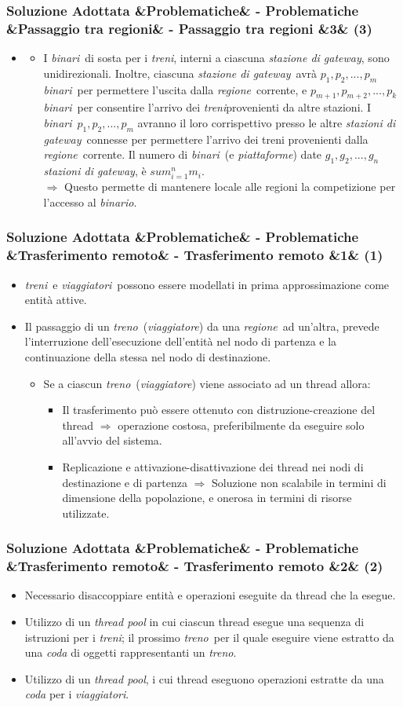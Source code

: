 \documentclass[slidestop,compress,blackandwhite]{beamer}
\newcommand{\ii}[1]{\textit{#1}}
\newcommand{\treno}{\ii{treno}}
\newcommand{\treni}{\ii{treni}}
\newcommand{\viaggiatore}{\ii{viaggiatore}}
\newcommand{\viaggiatori}{\ii{viaggiatori}}
\newcommand{\piattaforme}{\ii{piattaforme}}
\newcommand{\binario}{\ii{binario}}
\newcommand{\binari}{\ii{binari}}
\newcommand{\regione}{\ii{regione}}
\newcommand{\gateway}{\ii{stazione di gateway}}
\newcommand{\gateways}{\ii{stazioni di gateway}}
\newcommand{\newtitle}[4]{
	#1 
	\ifx&#2&%
	\else
  		\large- #2
	\fi
	\ifx&#3&%
	\else
  		\normalsize- #3
	\fi
	\ifx&#4&%
	\else
  		\normalsize (#4)
	\fi
}
\newcommand{\newframe}[5]{
	\begin{frame}
		\frametitle{\newtitle{#1}{#2}{#3}{#4}}
		#5
	\end{frame}
}
\newcommand{\myitemize}[1]{\begin{itemize}#1\end{itemize}}
\begin{document}
	\newframe{Soluzione Adottata}{Problematiche}{Passaggio tra regioni}{3}{
		\vspace{0.5cm}
		\myitemize{
			\item[] 
				\myitemize{
					\item I \binari~di sosta per i \treni, interni a ciascuna \gateway, sono unidirezionali. Inoltre, ciascuna \gateway~avrà $p_1,p_2,...,p_m$ \binari~per permettere l'uscita dalla \regione~corrente, e $p_{m+1},p_{m+2},...,p_k$ \binari~per consentire l'arrivo dei \treni provenienti da altre stazioni. I \binari~$p_1,p_2,...,p_m$ avranno il loro corrispettivo presso le altre \gateways~connesse per permettere l'arrivo dei treni provenienti dalla \regione~corrente. Il numero di \binari~(e \piattaforme) date  $g_1,g_2,...,g_n$ \gateways, è $sum_{i=1}^{n} m_i$.\\
						$\Rightarrow$ Questo permette di mantenere locale alle regioni la competizione per l'accesso al \binario.	
				}
		}	
	}
	
	\newframe{Soluzione Adottata}{Problematiche}{Trasferimento remoto}{1}{
		\myitemize{
			\item \treni~e \viaggiatori~possono essere modellati in prima approssimazione come entità attive. 
			\item Il passaggio di un \treno~(\viaggiatore) da una \regione~ad un'altra, prevede l'interruzione dell'esecuzione dell'entità nel nodo di partenza e la continuazione della stessa nel nodo di destinazione.
				\myitemize{
					\item Se a ciascun \treno~(\viaggiatore) viene associato ad un thread allora:
						\myitemize{
							\item Il trasferimento può essere ottenuto con distruzione-creazione del thread $\Rightarrow$ operazione costosa, preferibilmente da eseguire solo all'avvio del sistema.
							\item Replicazione e attivazione-disattivazione dei thread nei nodi di destinazione e di partenza $\Rightarrow$ Soluzione non scalabile in termini di dimensione della popolazione, e onerosa in termini di risorse utilizzate. 
						} 
				}
		}
	}
	
	\newframe{Soluzione Adottata}{Problematiche}{Trasferimento remoto}{2}{
		\myitemize{
			\item Necessario disaccoppiare entità e operazioni eseguite da thread che la esegue.
			\item Utilizzo di un \ii{thread pool} in cui ciascun thread esegue una sequenza di istruzioni per i \treni; il prossimo \treno~per il quale eseguire viene estratto da una \ii{coda} di oggetti rappresentanti un \treno.
			\item Utilizzo di un \ii{thread pool}, i cui thread eseguono operazioni estratte da una \ii{coda} per i \viaggiatori. 
		}
	}
\end{document}
